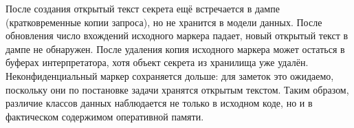После создания открытый текст секрета ещё встречается в дампе (кратковременные копии запроса), но не хранится в модели данных. После обновления число вхождений исходного маркера падает, новый открытый текст в дампе не обнаружен. После удаления копия исходного маркера может остаться в буферах интерпретатора, хотя объект секрета из хранилища уже удалён. Неконфиденциальный маркер сохраняется дольше: для заметок это ожидаемо, поскольку они по постановке задачи хранятся открытым текстом. Таким образом, различие классов данных наблюдается не только в исходном коде, но и в фактическом содержимом оперативной памяти.

